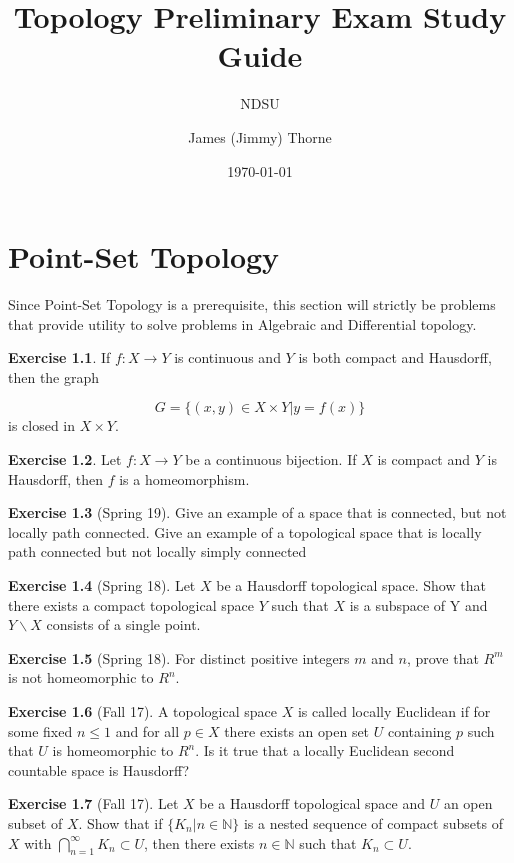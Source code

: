 \documentclass[12pt]{book}
\title{Topology Preliminary Exam Study Guide}
\subtitle{NDSU}
\author{James (Jimmy) Thorne}
\date{\today}
\newcommand{\nn}{\mathbb{N}}
\theoremstyle{definition}
\newtheorem{ex}{Exercise}
\begin{document}
	\maketitle
	
	\chapter{Point-Set Topology}
	Since Point-Set Topology is a prerequisite, this section will strictly be
	problems that provide utility to solve problems in Algebraic and Differential
	topology.
	\begin{ex}
		If $f:X\to Y$ is continuous and $Y$ is both compact and Hausdorff, then the
		graph
		
		$$G = \{ (x,y) \in X\times Y | y=f(x) \}$$
		is closed in $X\times Y$.
	\end{ex}

	\begin{ex}
		Let $f:X\to Y$ be a continuous bijection.  If $X$ is compact and $Y$ is 
		Hausdorff, then $f$ is a homeomorphism.
	\end{ex}

	\begin{ex}[Spring 19]
		Give an example of a space that is connected, but not locally path
		connected.  Give an example of a topological space that is  locally
		path connected but not locally simply connected
	\end{ex}

	\begin{ex}[Spring 18]
		 Let $X$ be a Hausdorff topological space.  Show that there exists a compact topological space $Y$ such that $X$ is a subspace of Y and $Y\backslash X$ consists of a single point.
	\end{ex}
	
	\begin{ex}[Spring 18]
		For distinct positive integers $m$ and $n$, prove that $R^m$ is not homeomorphic to $R^n$.
	\end{ex}

	\begin{ex}[Fall 17]
		A  topological  space $X$ is  called locally  Euclidean if for  some
		  fixed $n\leq 1$  and  for  all $p\in X$ there  exists  an  open
		   set $U$ containing $p$ such  that $U$ is  homeomorphic  to $R^n$.   Is
		   it  true  that  a locally Euclidean second countable space is Hausdorff?
	\end{ex}

	\begin{ex}[Fall 17]
		Let $X$ be  a  Hausdorff  topological  space  and $U$ an open subset of $X$.
		Show that if $\{K_n | n\in \nn \}$ is a nested sequence of compact subsets
		of $X$ with $\displaystyle\bigcap_{n=1}^{\infty}K_n\subset U$, then there
		 exists $n \in \nn $ such that $K_n\subset U$.
	\end{ex}
\end{document}

